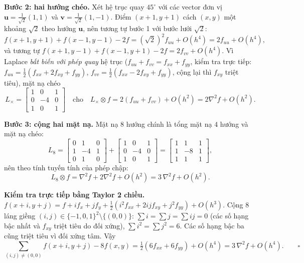 \textbf{Bước 2: hai hướng chéo.} Xét hệ trục quay $45^\circ$ với các vector đơn vị $\mathbf{u} = \frac{1}{\sqrt 2}(1, 1)$ và $\mathbf{v} = \frac{1}{\sqrt 2}(1, -1)$. Điểm $(x + 1, y + 1)$ cách $(x, y)$ một khoảng $\sqrt 2$ theo hướng $\mathbf{u}$, nên tương tự bước 1 với bước lưới $\sqrt 2$:
\begin{equation}
f(x + 1, y + 1) + f(x - 1, y - 1) - 2f = (\sqrt 2)^2 f_{uu} + O(h^4) = 2f_{uu} + O(h^4),
\end{equation}
và tương tự $f(x + 1, y - 1) + f(x - 1, y + 1) - 2f = 2f_{vv} + O(h^4)$. Vì Laplace \emph{bất biến với phép quay} hệ trục ($f_{uu} + f_{vv} = f_{xx} + f_{yy}$, kiểm tra trực tiếp: $f_{uu} = \tfrac12(f_{xx} + 2f_{xy} + f_{yy})$, $f_{vv} = \tfrac12(f_{xx} - 2f_{xy} + f_{yy})$, cộng lại thì $f_{xy}$ triệt tiêu), mặt nạ chéo
\begin{equation}
L_{\times} = \begin{bmatrix} 1 & 0 & 1 \\ 0 & -4 & 0 \\ 1 & 0 & 1 \end{bmatrix}
\quad \text{cho} \quad L_{\times} \otimes f = 2(f_{uu} + f_{vv}) + O(h^2) = 2\nabla^2 f + O(h^2).
\end{equation}

\textbf{Bước 3: cộng hai mặt nạ.} Mặt nạ $8$ hướng chính là tổng mặt nạ $4$ hướng và mặt nạ chéo:
\begin{equation}
L_8 = \begin{bmatrix} 0 & 1 & 0 \\ 1 & -4 & 1 \\ 0 & 1 & 0 \end{bmatrix} + \begin{bmatrix} 1 & 0 & 1 \\ 0 & -4 & 0 \\ 1 & 0 & 1 \end{bmatrix} = \begin{bmatrix} 1 & 1 & 1 \\ 1 & -8 & 1 \\ 1 & 1 & 1 \end{bmatrix},
\end{equation}
nên theo tính tuyến tính của phép chập:
\begin{equation}
L_8 \otimes f = \nabla^2 f + 2\nabla^2 f + O(h^2) = 3\,\nabla^2 f + O(h^2).
\end{equation}

\textbf{Kiểm tra trực tiếp bằng Taylor 2 chiều.} $f(x + i, y + j) = f + i f_x + j f_y + \tfrac12(i^2 f_{xx} + 2ij f_{xy} + j^2 f_{yy}) + O(h^3)$. Cộng $8$ láng giềng $(i, j) \in \{-1, 0, 1\}^2 \setminus \{(0, 0)\}$: $\sum i = \sum j = \sum ij = 0$ (các số hạng bậc nhất và $f_{xy}$ triệt tiêu do đối xứng), $\sum i^2 = \sum j^2 = 6$. Các số hạng bậc ba cũng triệt tiêu vì đối xứng tâm. Vậy
\begin{equation}
\sum_{(i, j) \ne (0, 0)} f(x + i, y + j) - 8f(x, y) = \tfrac12(6 f_{xx} + 6 f_{yy}) + O(h^4) = 3\,\nabla^2 f + O(h^4). \qquad \square
\end{equation}

